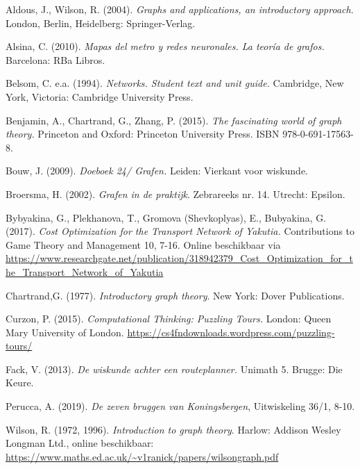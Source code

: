 \begin{bronnen}

\item Aldous, J., Wilson, R. (2004). \emph{Graphs and applications, an introductory approach.} London, Berlin, Heidelberg: Springer-Verlag.

\item Alsina, C. (2010). \emph{Mapas del metro y redes neuronales. La teoría de grafos.} Barcelona: RBa Libros.

\item Belsom, C. e.a. (1994). \emph{Networks. Student text and unit guide.} Cambridge, New York, Victoria: Cambridge University Press.

\item Benjamin, A., Chartrand, G., Zhang, P. (2015). \emph{The fascinating world of graph theory.} Princeton and Oxford: Princeton University Press. ISBN 978-0-691-17563-8.

\item Bouw, J. (2009). \emph{Doeboek 24/ Grafen.} Leiden: Vierkant voor wiskunde.

\item Broersma, H. (2002). \emph{Grafen in de praktijk}. Zebrareeks nr. 14. Utrecht: Epsilon.

\item Bybyakina, G., Plekhanova, T., Gromova (Shevkoplyas), E., Bubyakina, G. (2017). \emph{Cost Optimization for the Transport Network of Yakutia.} Contributions to Game Theory and Management 10, 7-16. Online beschikbaar via \url{https://www.researchgate.net/publication/318942379_Cost_Optimization_for_the_Transport_Network_of_Yakutia}

\item Chartrand,G. (1977). \emph{Introductory graph theory}. New York: Dover Publications.

\item Curzon, P. (2015). \emph{Computational Thinking: Puzzling Tours.} London: Queen Mary University of London. \url{https://cs4fndownloads.wordpress.com/puzzling-tours/}

\item Fack, V. (2013). \emph{De wiskunde achter een routeplanner.} Unimath 5. Brugge: Die Keure.

\item Perucca, A. (2019). \emph{De zeven bruggen van Koningsbergen}, Uitwiskeling 36/1, 8-10.

\item Wilson, R. (1972, 1996). \emph{Introduction to graph theory}. Harlow: Addison Wesley Longman Ltd., online beschikbaar: \url{ https://www.maths.ed.ac.uk/~v1ranick/papers/wilsongraph.pdf}


\end{bronnen}

